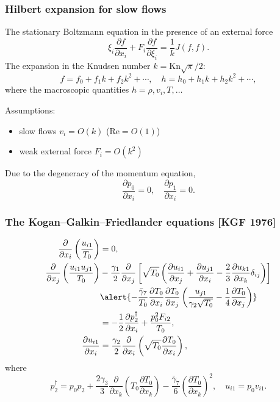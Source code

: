 \documentclass[mathserif]{beamer} %
\newcommand{\Kn}{\mathrm{Kn}}
\newcommand{\pder}[2][]{\frac{\partial#1}{\partial#2}}
\newcommand{\OO}[1]{O(#1)}
\begin{document}
\begin{frame}
    \frametitle{Hilbert expansion for slow flows}
    The stationary Boltzmann equation in the presence of an external force
    \begin{equation}\label{eq:Boltzmann}
        \xi_i\pder[f]{x_i} + F_i\pder[f]{\xi_i} = \frac1k J(f,f).
    \end{equation}
    The expansion in the Knudsen number \(k=\Kn\sqrt\pi/2\):
    \begin{equation}\label{eq:expansion}
        f = f_0 + f_1k + f_2k^2 + \cdots, \quad h = h_0 + h_1k + h_2k^2 + \cdots,
    \end{equation}
    where the macroscopic quantities \(h = \rho, v_i, T, \dots\)
    \vspace{5pt}\pause

    Assumptions:
    \begin{itemize}
        \item slow flows \(v_i = \OO{k}\) (\(\mathrm{Re} = \OO{1}\))
        \item weak external force \(F_i = \OO{k^2}\)
    \end{itemize}
    Due to the degeneracy of the momentum equation,
    \begin{equation}
        \pder[p_0]{x_i} = 0, \quad \pder[p_1]{x_i} = 0.
    \end{equation}
\end{frame}

\begin{frame}
    \frametitle{The Kogan--Galkin--Friedlander equations [KGF 1976]}
    \begin{align}
        \pder{x_i}\left(\frac{u_{i1}}{T_0}\right) &= 0, \label{eq:asymptotic1} \\
        \pder{x_j}\left(\frac{u_{i1}u_{j1}}{T_0}\right)
            &-\frac{\gamma_1}2\pder{x_j}\left[\sqrt{T_0}\left(
                \pder[u_{i1}]{x_j} + \pder[u_{j1}]{x_i} - \frac23\pder[u_{k1}]{x_k}\delta_{ij}
            \right)\right] \notag\\
            &\alert{- \frac{\bar{\gamma}_7}{T_0}\pder[T_0]{x_i}\pder[T_0]{x_j}
                \left(\frac{u_{j1}}{\gamma_2\sqrt{T_0}} - \frac{1}4\pder[T_0]{x_j}\right)} \notag\\
            &= -\frac12\pder[p_2^\dag]{x_i} + \frac{p_0^2 F_{i2}}{T_0}, \label{eq:asymptotic2} \\
        \pder[u_{i1}]{x_i} &= \frac{\gamma_2}2\pder{x_i}\left(\sqrt{T_0}\pder[T_0]{x_i}\right), \label{eq:asymptotic3}
    \end{align}
    where
    \begin{equation}\label{eq:dag_pressure}
        p_2^\dag = p_0 p_2
            + \frac{2\gamma_3}{3}\pder{x_k}\left(T_0\pder[T_0]{x_k}\right)
            - \frac{\bar{\gamma}_7}{6}\left(\pder[T_0]{x_k}\right)^2, \quad u_{i1} = p_0v_{i1}.
    \end{equation}
\end{frame}
\end{document}
